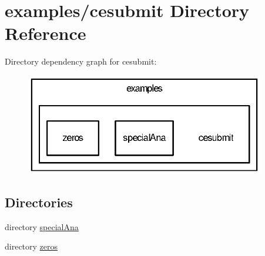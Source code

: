 \section{examples/cesubmit Directory Reference}
\label{dir_bb7348b63b2005d0b0d15b0f3d93662e}
Directory dependency graph for cesubmit\-:
\nopagebreak
\begin{figure}[H]
\begin{center}
\leavevmode
\includegraphics[width=296pt]{dir_bb7348b63b2005d0b0d15b0f3d93662e_dep}
\end{center}
\end{figure}
\subsection*{Directories}
\begin{DoxyCompactItemize}
\item 
directory \hyperlink{dir_5f52a5d349e3c39d8301290a550b4386}{special\-Ana}
\item 
directory \hyperlink{dir_26d746cfbec85a1dd7e060e6a1a1b724}{zeros}
\end{DoxyCompactItemize}
